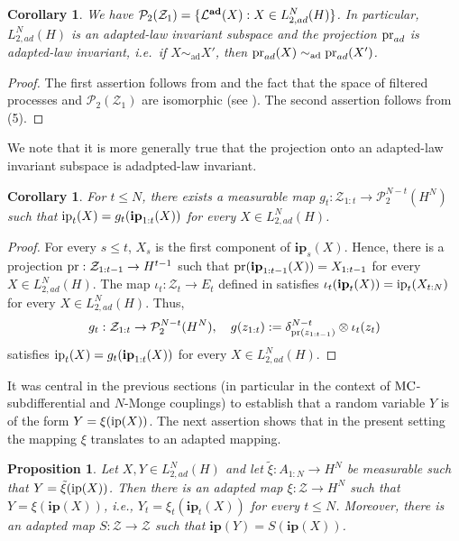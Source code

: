 \documentclass[a4paper]{amsart}
\numberwithin{theorem}{section}
\newtheorem{proposition}[theorem]{Proposition}
\newtheorem{corollary}[theorem]{Corollary}
\theoremstyle{definition}
\newcommand{\pr}{\textup{pr}}
\newcommand{\law}{\mathcal{L}}
\newcommand{\Pc}{\mathcal P}
\newcommand{\simad}{\sim_{\mathrm{ad}}}
\renewcommand{\H}{H}
\newcommand{\mc}{\textup{MC}}
\newcommand{\ip}{\textup{ip}}
\newcommand{\Zc}{\mathcal{Z}}
\newcommand{\ipp}{\mathbf{ip}}
\newcommand{\lawadd}{\law^{\textnormal{\textbf{ad}}}}
\begin{document}
\begin{corollary}\label{cor:ad_is_lawadinv}
We have $\Pc_2(\Zc_1) = \{ \lawadd(X) : X \in L_{2,ad}^N(H) \}$. 
In particular, $L_{2,ad}^N(H)$ is an adapted-law invariant subspace and the projection $\pr_{ad}$ is adapted-law invariant, i.e.\ if $X \simad X'$, then $\pr_{ad}(X) \simad \pr_{ad}(X')$.
\end{corollary}
\begin{proof}
The first assertion follows from  and the fact that the space of filtered processes and $\Pc_2(\Zc_1)$ are isomorphic (see ). The second assertion follows from  (5).
\end{proof}
We note that it is more generally true that the projection onto an adapted-law invariant subspace is adadpted-law invariant. 

\begin{corollary}\label{cor:iptranslation2}
For $t \le N$, there exists a measurable map $g_t : \Zc_{1:t} \to \Pc_2^{N-t}(H^N) $ such that $\ip_t(X) = g_t(\ipp_{1:t}(X))$ for every $X \in L_{2,ad}^N(H)$.
\end{corollary}
\begin{proof}
 For every $s \le t$, $X_s$ is the first component of $\ipp_s(X)$. 
 Hence, there is a projection $\pr : \Zc_{1:t-1} \to \H^{t-1}$ such that $\pr(\ipp_{1:t-1}(X))=X_{1:t-1}$ for every $X \in L_{2,ad}^N(H)$. The map $\iota_t : \Zc_t \to E_t$ defined in  satisfies $\iota_t(\ipp_t(X))= \ip_t(X_{t:N})$ for every $X \in L_{2,ad}^N(H)$. Thus,
 \[
 g_t : \Zc_{1:t} \to \Pc_2^{N-t}(H^N), \quad g(z_{1:t}) := \delta^{N-t}_{\pr(z_{1:t-1})} \otimes \iota_t(z_t)
 \]
 satisfies $\ip_t(X) = g_t(\ipp_{1:t}(X))$ for every $X \in L_{2,ad}^N(H)$.
\end{proof}

It was central in the previous sections (in particular in the context of $\mc$-subdifferential and $N$-Monge couplings) to establish that a random variable $Y$ is of the form $Y = \xi(\ip(X))$. The next assertion shows that in the present setting the mapping $\xi$ translates to an adapted mapping. 

\begin{proposition}\label{prop:xi_is_adapted}
Let $X,Y \in L_{2,ad}^N(\H)$ and let $\tilde\xi : A_{1:N} \to H^N $ be measurable such that $Y = \tilde\xi(\ip(X))$. 
Then there is an adapted map $\xi : \Zc \to H^N$ such that $Y = \xi(\ipp(X))$, i.e., $Y_t = \xi_t(\ipp_t(X))$ for every $t \le N$.
Moreover, there is an adapted map $S : \Zc \to \Zc$ such that $\ipp(Y) = S(\ipp(X))$. 
\end{proposition}
\end{document}
